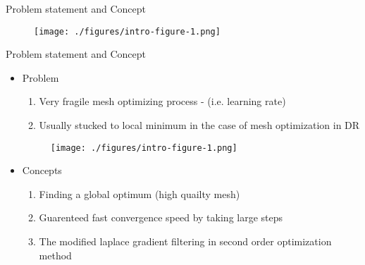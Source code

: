 \documentclass[beamer]{standalone}
\begin{document}
\begin{frame}{Problem statement and Concept}
    \begin{figure}
        \texttt{[image: ./figures/intro-figure-1.png]}
    \end{figure}


\end{frame}

\begin{frame}{Problem statement and Concept}
    \begin{itemize}
        \setlength\itemsep{1em}
        \item Problem 
        \begin{enumerate}
            \item \alert{Very fragile} mesh optimizing process - (i.e. learning rate)
            \item Usually stucked to local minimum in the case of mesh optimization in DR
        \end{enumerate}

        \begin{figure}
            \texttt{[image: ./figures/intro-figure-1.png]}
        \end{figure}

        \pause

        \item Concepts
        \begin{enumerate}
            \item Finding a global optimum (high quailty mesh)
            \item Guarenteed fast convergence speed by taking large steps
            \item The modified laplace gradient filtering in second order optimization method
        \end{enumerate}
    \end{itemize}
    
\end{frame}
\end{document}
